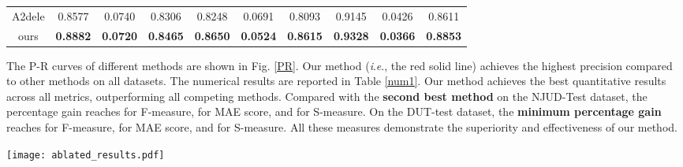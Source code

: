 \documentclass[runningheads]{llncs}
\newcommand{\ie}{\textit{i}.\textit{e}.}
\begin{document}
\begin{table*}[t]
\begin{center}
\begin{tabular}{|c|c|c|c||c|c|c||c|c|c|}
			A2dele \cite{A2dele} & 0.8577 & 0.0740 & 0.8306 & 0.8248 & 0.0691 & 0.8093 & 0.9145 & 0.0426 & 0.8611  \\
			
			ours  & \textbf{0.8882} & \textbf{0.0720} & \textbf{0.8465} & \textbf{0.8650} & \textbf{0.0524} & \textbf{0.8615} & \textbf{0.9328} & \textbf{0.0366} & \textbf{0.8853} \\
			\hline
		\end{tabular}
	\end{center}
	\label{num1}
\end{table*}



The P-R curves of different methods are shown in Fig. \ref{PR}. Our method (\ie, the red solid line) achieves the highest precision compared to other methods on all datasets. The numerical results are reported in Table \ref{num1}. Our method achieves the best quantitative results across all metrics, outperforming all competing methods.  Compared with the \textbf{second best method} on the NJUD-Test dataset, the percentage gain reaches  for F-measure,  for MAE score, and  for S-measure. On the DUT-test dataset, the \textbf{minimum percentage gain} reaches  for F-measure,  for MAE score, and  for S-measure. All these measures demonstrate the superiority and effectiveness of our method.


\begin{figure*}[!t]
	\centering
	\texttt{[image: ablated\_results.pdf]}
	\caption{Visual comparison with different baselines. \textbf{(1)} The baseline \textit{w/o cmFM} represents our full model without the cmFM module (\ie, no modulated features); and the baselines \textit{w/ cmFA} and \textit{w/ cmFC} refer to that the cmFM module is replaced by the cmFA or cmFC module (\ie, the depth and RGB features are integrated by the element-wise addition or concatenation). \textbf{(2)} The baseline \textit{w/o AFS} represents our full model without the AFS module (\ie, the features after cmFM module are directly concatenated with the up-sampled saliency-related features); the baselines \textit{w/o GFF} and \textit{w/o CACA} correspond to removing the fused spatial features and the channel attention-on-channel attention features, respectively; and the baseline  \textit{w/ CA} refers to that the AFS module is replaced by the conventional channel attention module \cite{ChannelAtt}. \textbf{(3)} The baselines \textit{w/o PEA}, \textit{w/o PA}, and \textit{w/o PE} correspond to our full model without the sg-PEA module, the position attention unit, and the edge attention unit, respectively.}
	\label{ablation_results}
\end{figure*}
\end{document}
